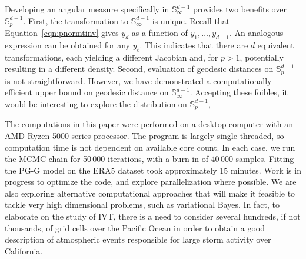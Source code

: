 Developing an angular measure specifically in $\mathbb{S}_{\infty}^{d-1}$ provides 
    two benefits over $\mathbb{S}_p^{d-1}$.  First, the transformation to 
    $\mathbb{S}_{\infty}^{d-1}$ is unique.  Recall that 
    Equation~\eqref{eqn:pnormtinv} gives $y_d$ as a function
    of $y_1,\ldots,y_{d-1}$. An analogous expression can be obtained for
    any $y_{\ell}$. This indicates that there are $d$ equivalent transformations, 
    each yielding a different
    Jacobian and, for $p>1$, potentially resulting in a different density.  
    Second, evaluation of geodesic distances on $\mathbb{S}_p^{d-1}$ is not 
    straightforward.  However, we have demonstrated a computationally efficient 
    upper bound on geodesic distance on $\mathbb{S}_{\infty}^{d-1}$.  Accepting
    these foibles, it would be interesting to explore the distribution on 
    $\mathbb{S}_{p}^{d-1}$, 
 
The computations in this paper were performed on a desktop computer with an 
    AMD Ryzen 5000 series processor. The program is largely single-threaded, so 
    computation time is not dependent on available core count.  In each case, 
    we run the MCMC chain for 50\,000 iterations, with a burn-in of 40\,000 
    samples.  Fitting the PG-G model on the ERA5 dataset took approximately 
    15 minutes.  Work is in progress to optimize the code, and explore 
    parallelization where possible.  We are also exploring alternative 
    computational approaches that will make it feasible to tackle very high 
    dimensional problems, such as variational Bayes. In fact, to elaborate on 
    the study of IVT, there is a need to consider several hundreds, if not thousands, 
    of grid cells over the Pacific Ocean in order to obtain a good description of 
    atmospheric events responsible for large storm activity over California.  



